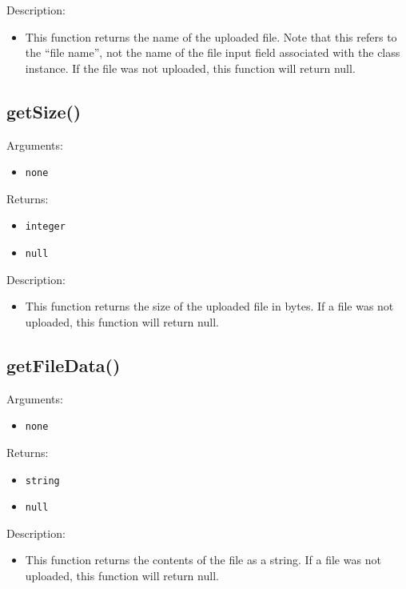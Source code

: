 \documentclass[10pt]{article}
\begin{document}
\noindent Description:
\begin{itemize}
\item This function returns the name of the uploaded file.  Note that this refers to the ``file name'', not the name of the file input field associated with the class instance.  If the file was not uploaded, this function will return null.
\end{itemize}


\subsection{getSize()}

\noindent Arguments:
\begin{itemize}
\item \verb!none!
\end{itemize}

\noindent Returns:
\begin{itemize}
\item \verb!integer!
\item \verb!null!
\end{itemize}

\noindent Description:
\begin{itemize}
\item This function returns the size of the uploaded file in bytes.  If a file was not uploaded, this function will return null.
\end{itemize}


\subsection{getFileData()}

\noindent Arguments:
\begin{itemize}
\item \verb!none!
\end{itemize}

\noindent Returns:
\begin{itemize}
\item \verb!string!
\item \verb!null!
\end{itemize}

\noindent Description:
\begin{itemize}
\item This function returns the contents of the file as a string.  If a file was not uploaded, this function will return null.
\end{itemize}
\end{document}
